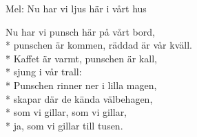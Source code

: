 \begin{SongText}
    \begin{SongInfo}
        Mel: Nu har vi ljus här i vårt hus
    \end{SongInfo}
    \begin{SongVerse}
        Nu har vi punsch här på vårt bord,\\*%
        punschen är kommen, räddad är vår kväll.\\*%
        Kaffet är varmt, punschen är kall,\\*%
        sjung i vår trall:\\*%
        Punschen rinner ner i lilla magen,\\*%
        skapar där de kända välbehagen,\\*%
        som vi gillar, som vi gillar,\\*%
        ja, som vi gillar till tusen.
    \end{SongVerse}
\end{SongText}